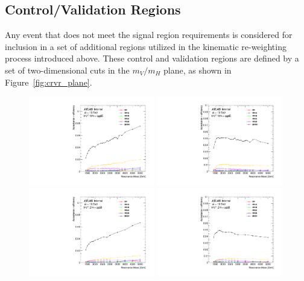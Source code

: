 \subsection{Control/Validation Regions}
Any event that does not meet the signal region requirements is considered for inclusion in a set of additional regions utilized in the kinematic re-weighting process introduced above.
These control and validation regions are defined by a set of two-dimensional cuts in the $m_V/m_H$ plane, as shown in Figure~\ref{fig:crvr_plane}.

\begin{figure}[htbp!]
\begin{center}
\includegraphics[width=0.49\textwidth]{VHqqbb_Region_Efficiency_Comparison_WH_Ntag1.pdf}
\includegraphics[width=0.49\textwidth]{VHqqbb_Region_Efficiency_Comparison_WH_Ntag2.pdf} \\
\includegraphics[width=0.49\textwidth]{VHqqbb_Region_Efficiency_Comparison_ZH_Ntag1.pdf}
\includegraphics[width=0.49\textwidth]{VHqqbb_Region_Efficiency_Comparison_ZH_Ntag2.pdf}

\end{center}
\end{figure}
